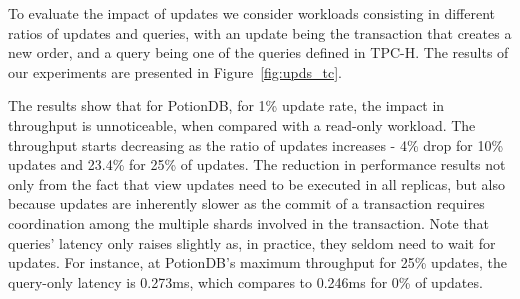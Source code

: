 \documentclass[sigplan,twocolumn,review,anonymous]{acmart}
\begin{document}
To evaluate the impact of updates we consider workloads consisting in different ratios of updates and queries, with
an update being the transaction that creates a new order, and a query being one of the queries defined in
TPC-H.
The results of our experiments
are presented in Figure~\ref{fig:upds_tc}.

The results show that for PotionDB, for 1\% update rate, the impact in throughput is unnoticeable, when compared with a read-only workload.
The throughput starts decreasing as the ratio of updates increases - 4\% drop for 10\% updates and 23.4\% for 25\% of updates.
The reduction in performance results not only from the fact that view updates need to be executed in all replicas, but also because 
updates are inherently slower as the commit of a transaction requires coordination among the multiple shards involved in the transaction. 
Note that queries' latency only raises slightly as, in practice, they seldom need to wait for updates.
For instance, at PotionDB's maximum throughput for 25\% updates, the query-only latency is 0.273ms, which compares to 0.246ms for 0\% of updates.

\end{document}
